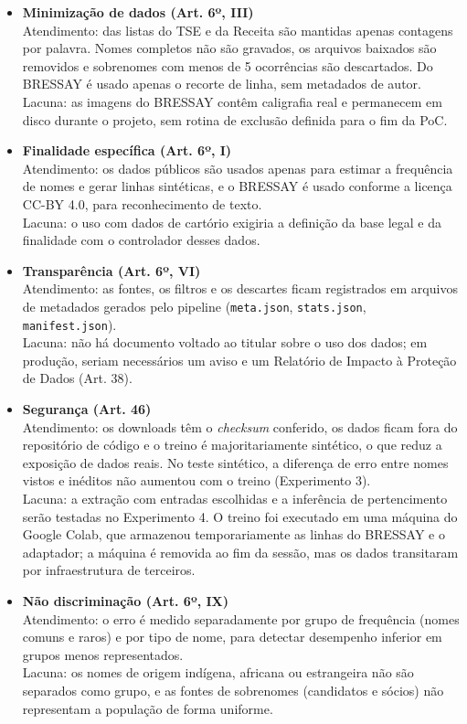 \documentclass[12pt,a4paper]{article}
\begin{document}
\begin{itemize}
    \item \textbf{Minimização de dados (Art. 6º, III)} \\
    Atendimento: das listas do TSE e da Receita são mantidas apenas contagens por palavra. Nomes completos não são gravados, os arquivos baixados são removidos e sobrenomes com menos de 5 ocorrências são descartados. Do BRESSAY é usado apenas o recorte de linha, sem metadados de autor. \\
    Lacuna: as imagens do BRESSAY contêm caligrafia real e permanecem em disco durante o projeto, sem rotina de exclusão definida para o fim da PoC.

    \item \textbf{Finalidade específica (Art. 6º, I)} \\
    Atendimento: os dados públicos são usados apenas para estimar a frequência de nomes e gerar linhas sintéticas, e o BRESSAY é usado conforme a licença CC-BY 4.0, para reconhecimento de texto. \\
    Lacuna: o uso com dados de cartório exigiria a definição da base legal e da finalidade com o controlador desses dados.

    \item \textbf{Transparência (Art. 6º, VI)} \\
    Atendimento: as fontes, os filtros e os descartes ficam registrados em arquivos de metadados gerados pelo pipeline (\texttt{meta.json}, \texttt{stats.json}, \texttt{manifest.json}). \\
    Lacuna: não há documento voltado ao titular sobre o uso dos dados; em produção, seriam necessários um aviso e um Relatório de Impacto à Proteção de Dados (Art. 38).

    \item \textbf{Segurança (Art. 46)} \\
    Atendimento: os downloads têm o \emph{checksum} conferido, os dados ficam fora do repositório de código e o treino é majoritariamente sintético, o que reduz a exposição de dados reais. No teste sintético, a diferença de erro entre nomes vistos e inéditos não aumentou com o treino (Experimento 3). \\
    Lacuna: a extração com entradas escolhidas e a inferência de pertencimento serão testadas no Experimento 4. O treino foi executado em uma máquina do Google Colab, que armazenou temporariamente as linhas do BRESSAY e o adaptador; a máquina é removida ao fim da sessão, mas os dados transitaram por infraestrutura de terceiros.

    \item \textbf{Não discriminação (Art. 6º, IX)} \\
    Atendimento: o erro é medido separadamente por grupo de frequência (nomes comuns e raros) e por tipo de nome, para detectar desempenho inferior em grupos menos representados. \\
    Lacuna: os nomes de origem indígena, africana ou estrangeira não são separados como grupo, e as fontes de sobrenomes (candidatos e sócios) não representam a população de forma uniforme.
\end{itemize}
\end{document}
